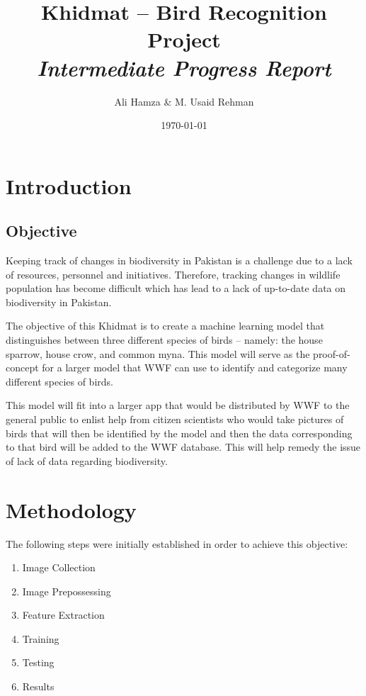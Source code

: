 \documentclass[11pt]{article}
\title{Khidmat -- Bird Recognition Project\\ \textit{Intermediate Progress Report}}
\author{Ali Hamza \& M. Usaid Rehman}
\date{\today}
\begin{document}
    \maketitle
    \section*{Introduction}
    \subsection*{Objective}
    Keeping track of changes in biodiversity in Pakistan is a challenge due to a lack of resources, personnel and initiatives. Therefore, tracking changes in wildlife population has become difficult which has lead to a lack of up-to-date data on biodiversity in Pakistan. 
    
    The objective of this Khidmat is to create a machine learning model that distinguishes between three different species of birds -- namely: the house sparrow, house crow, and common myna. This model will serve as the proof-of-concept for a larger model that WWF can use to identify and categorize many different species of birds.
    
    This model will fit into a larger app that would be distributed by WWF to the general public to enlist help from citizen scientists who would take pictures of birds that
    will then be identified by the model and then the data corresponding to that bird will
    be added to the WWF database. This will help remedy the issue of lack of data regarding biodiversity.
    
    \section*{Methodology}
    The following steps were initially established in order to achieve this objective:
    
    \begin{enumerate}
        \item Image Collection
        \item Image Prepossessing
        \item Feature Extraction
        \item Training
        \item Testing
        \item Results
    \end{enumerate}
\end{document}
